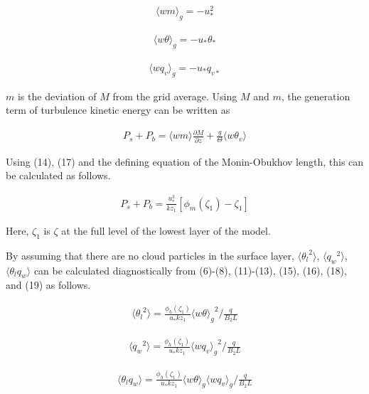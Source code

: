 \begin{eqnarray} \langle wm \rangle_g = -u_*^2 \label{17}\end{eqnarray}

\begin{eqnarray} \langle w\theta \rangle_g = -u_*\theta_* \label{18}\end{eqnarray}

\begin{eqnarray} \langle wq_v \rangle_g = -u_*q_{v*} \label{19}\end{eqnarray}

\(m\) is the deviation of \(M\) from the grid average. Using \(M\) and
\(m\), the generation term of turbulence kinetic energy can be written
as

\begin{eqnarray} P_s + P_b = \langle wm \rangle \frac{\partial M}{\partial z} + \frac{g}{\Theta} \langle w\theta_v \rangle \end{eqnarray}

Using (14), (17) and the defining equation of the Monin-Obukhov length,
this can be calculated as follows.

\begin{eqnarray} P_s + P_b = \frac{u_*^3}{kz_1}\left[\phi_m\left(\zeta_1\right)-\zeta_1\right] \end{eqnarray}

Here, \(\zeta_1\) is \(\zeta\) at the full level of the lowest layer of
the model.

By assuming that there are no cloud particles in the surface layer,
\(\langle {\theta_l}^2\rangle\), \(\langle {q_w}^2\rangle\),
\(\langle \theta_lq_w\rangle\) can be calculated diagnostically from
(6)-(8), (11)-(13), (15), (16), (18), and (19) as follows.

\begin{eqnarray}\langle {\theta_l}^2\rangle=\frac{\phi_h\left(\zeta_1\right)}{u_*kz_1}{\langle w\theta \rangle_g}^2 \bigg/ \frac{q}{B_2L} \end{eqnarray}

\begin{eqnarray}\langle {q_w}^2\rangle=\frac{\phi_h\left(\zeta_1\right)}{u_*kz_1}{\langle wq_v\rangle_g}^2 \bigg/ \frac{q}{B_2L} \end{eqnarray}

\begin{eqnarray}\langle \theta_lq_w\rangle=\frac{\phi_h\left(\zeta_1\right)}{u_*kz_1}\langle w\theta \rangle_g\langle wq_v \rangle_g \bigg/ \frac{q}{B_2L} \end{eqnarray}


